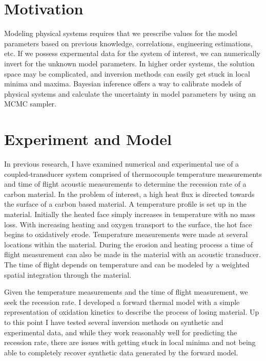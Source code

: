\documentclass[11pt]{article}
\begin{document}
\pagestyle{plain}


\section{Motivation}
Modeling physical systems requires that we prescribe values for the model parameters based on previous knowledge, correlations, engineering estimations, etc. If we possess expermental data for the system of interest, we can numerically invert for the unknown model parameters. In higher order systems, the solution space may be complicated, and inversion methods can easily get stuck in local minima and maxima. Bayesian inference offers a way to calibrate models of physical systems and calculate the uncertainty in model parameters by using an MCMC sampler.

\section{Experiment and Model}
In previous research, I have examined numerical and experimental use of a coupled-transducer system comprised of thermocouple temperature measurements and time of flight acoustic measurements to determine the recession rate of a carbon material. In the problem of interest, a high heat flux is directed towards the surface of a carbon based material. A temperature profile is set up in the material. Initially the heated face simply increases in temperature with no mass loss. With increasing heating and oxygen transport to the surface, the hot face begins to oxidatively erode. Temperature measurements were made at several locations within the material. During the erosion and heating process a time of flight measurement can also be made in the material with an acoustic transducer. The time of flight depends on temperature and can be modeled by a weighted spatial integration through the material.

Given the temperature measurements and the time of flight measurement, we seek the recession rate. I developed a forward thermal model with a simple representation of oxidation kinetics to describe the process of losing material. Up to this point I have tested several inversion methods on synthetic and experimental data, and while they work reasonably well for predicting the recession rate, there are issues with getting stuck in local minima and not being able to completely recover synthetic data generated by the forward model.
\end{document}
